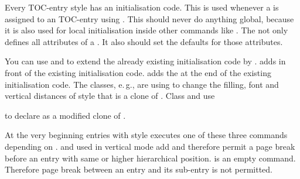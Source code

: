 \begin{Declaration}
\end{Declaration}
Every TOC-entry style has an
initialisation code. This is used whenever a  is assigned to an
TOC-entry using . This
 should never do anything global, because it is also used
for local initialisation inside other commands like
. The  not
only defines all attributes of a . It also should set the
defaults for those attributes.

You can use  and
 to extend the already existing initialisation
code by .  adds
 in front of the existing initialisation
code.  adds the  at the end
of the existing initialisation code. The \KOMAScript{} classes, e.\,g., are
using  to change the filling, font and
vertical distances of style  that is a clone of
. Class  and  use
\begin{lstcode}
  \TOCEntryStyleStartInitCode{section}{%
    \expandafter\providecommand%
    \csname scr@tso@#1@linefill\endcsname
    {\TOCLineLeaderFill\relax}%
  }
\end{lstcode}
to declare  as a modified clone of .%
\EndIndexGroup


\begin{Declaration}
\end{Declaration}
At the very beginning entries
with style   executes one of these three
commands depending on .  and
 used in vertical mode add
 and therefore permit a
page break before an entry with same or higher hierarchical
position.  is an empty command. Therefore page
break between an entry and its sub-entry is not permitted.

